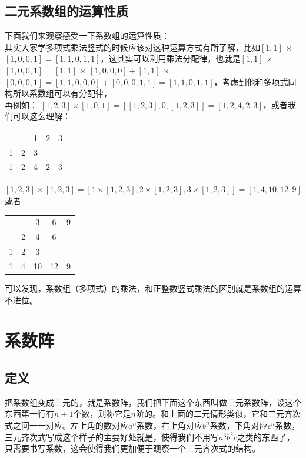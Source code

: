 \documentclass[UTF8]{ctexart}
\begin{document}
\subsection{二元系数组的运算性质}
下面我们来观察感受一下系数组的运算性质：\\
其实大家学多项式乘法竖式的时候应该对这种运算方式有所了解，比如$ [1,1]$ × $[1,0,0,1]=[1,1,0,1,1] $，这其实可以利用乘法分配律，也就是$ [1,1]$ × $[1,0,0,1]=[1,1]$ × $[1,0,0,0]+[1,1]$ × $[0,0,0,1]=[1,1,0,0,0]+[0,0,0,1,1]=[1,1,0,1,1] $，考虑到他和多项式同构所以系数组可以有分配律，\\
再例如：
$[1,2,3] \times[1,0,1]=[[1,2,3], 0,[1,2,3]]=[1,2,4,2,3]$，或者我们可以这么理解：
\begin{center}
	\begin{tabular}{ccccc}
		&  & 1 & 2 & 3 \\
		1& 2 & 3 &  &  \\
		\hline
		1& 2 & 4 & 2 & 3 \\
	\end{tabular}
\end{center}
$[1,2,3] \times[1,2,3]=[1 \times[1,2,3], 2 \times[1,2,3], 3 \times[1,2,3]]=[1,4,10,12,9]$或者
\begin{center}
	\begin{tabular}{ccccc}
		
		&  & 3 & 6 & 9 \\
		& 2 & 4 & 6 &  \\
		1& 2 & 3 &  &  \\
		\hline
		1& 4 & 10 & 12 & 9 \\
	\end{tabular}
\end{center}
可以发现，系数组（多项式）的乘法，和正整数竖式乘法的区别就是系数组的运算不进位。
\section{系数阵}
\subsection{定义}
把系数组变成三元的，就是系数阵，我们把下面这个东西叫做三元系数阵，设这个东西第一行有$ n+1 $个数，则称它是$ n $阶的。和上面的二元情形类似，它和三元齐次式之间一一对应。左上角的数对应$ a^n $系数，右上角对应$ b^n $系数，下角对应$ c^n $系数，三元齐次式写成这个样子的主要好处就是，使得我们不用写$ a^{3}b^{2}c $之类的东西了，只需要书写系数，这会使得我们更加便于观察一个三元齐次式的结构。
\end{document}
